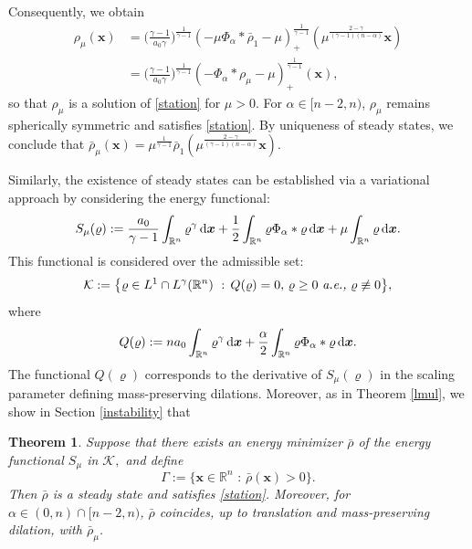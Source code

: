 \documentclass[reqno,11pt]{amsart}
\numberwithin{equation}{section}
\newtheorem{theorem}{Theorem}[section]
\theoremstyle{definition}
\def\dd{{\, \rm d}}
\begin{document}
Consequently, we obtain 
\[
\begin{split}
\rho_\mu(\boldsymbol{x}) & 
= \Big ( \frac{\gamma - 1}{a_0 \gamma} \Big )^\frac{1}{\gamma - 1} (- \mu \Phi_\alpha * \bar{\rho}_1 - \mu)_+^\frac{1}{\gamma - 1}(\mu^\frac{2-\gamma}{(\gamma - 1)(n-\alpha)}\boldsymbol{x}) \\
 & = \Big ( \frac{\gamma - 1}{a_0 \gamma} \Big )^\frac{1}{\gamma - 1} (- \Phi_\alpha * \rho_\mu - \mu)_+^\frac{1}{\gamma - 1}(\boldsymbol{x}),        \end{split}
\]
so that $\rho_\mu$ is a solution of \eqref{station} for $\mu > 0$. 
For $\alpha \in [n-2,n)$, $\rho_\mu$ remains spherically symmetric and satisfies \eqref{station}.
By uniqueness of steady states, we conclude that 
$\bar{\rho}_\mu(\boldsymbol{x}) 
= \mu^\frac{1}{\gamma - 1}
\bar{\rho}_1 (\mu^\frac{2-\gamma}{(\gamma - 1)(n-\alpha)} \boldsymbol{x})$. 

Similarly, the existence of steady states can be established via a variational approach by
considering the energy functional:
\[
S_\mu(\varrho) := \frac{a_0}{\gamma - 1} \int_{\mathbb{R}^n} \varrho^\gamma \dd \boldsymbol{x} + \frac{1}{2} \int_{\mathbb{R}^n} \varrho \Phi_\alpha * \varrho \dd \boldsymbol{x} + \mu \int_{\mathbb{R}^n} \varrho \dd \boldsymbol{x}.
\]
This functional is considered over the admissible set:
\[
\mathcal{K} := \big\{ \varrho \in L^1 \cap L^\gamma(\mathbb{R}^n) \,\, : \, Q(\varrho) = 0, \, \varrho \geq 0 \text{ {\it a.e.,} } \varrho \not\equiv 0\big\},
\]
where 
\[
Q(\varrho) := n a_0 \int_{\mathbb{R}^n} \varrho^\gamma \dd \boldsymbol{x} + \frac{\alpha}{2} \int_{\mathbb{R}^n} \varrho \Phi_\alpha * \varrho \dd \boldsymbol{x}.
\]
The functional $Q(\varrho)$ corresponds to the derivative of $S_\mu(\varrho)$ 
in the scaling parameter defining mass-preserving dilations. 
Moreover, as in Theorem \ref{lmul}, we show in Section \ref{instability} that
 
\begin{theorem}\label{minform}
Suppose that there exists an energy minimizer $\bar{\rho}$ of the energy functional $S_\mu$ in $\mathcal{K},$ and define
\[ \Gamma := \{ \boldsymbol{x} \in \mathbb{R}^n \,\,: \, \bar{\rho}(\boldsymbol{x}) > 0 \}.
\]
Then $\bar{\rho}$ is a steady state and satisfies \eqref{station}. 
Moreover, for $\alpha \in (0,n) \cap [n-2,n)$, $\bar{\rho}$ coincides, up to translation 
and mass-preserving dilation,
with $\bar{\rho}_\mu$.
\end{theorem}
\end{document}
